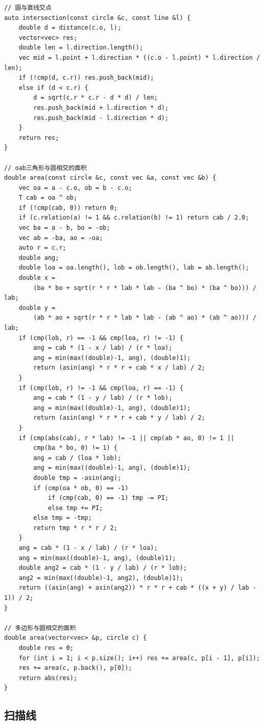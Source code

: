 \documentclass[UTF8]{ctexart}
\begin{document}
\begin{sloppypar}
\begin{lstlisting}[style=cpp]
// 圆与直线交点
auto intersection(const circle &c, const line &l) {
    double d = distance(c.o, l);
    vector<vec> res;
    double len = l.direction.length();
    vec mid = l.point + l.direction * ((c.o - l.point) * l.direction / len);
    if (!cmp(d, c.r)) res.push_back(mid);
    else if (d < c.r) {
        d = sqrt(c.r * c.r - d * d) / len;
        res.push_back(mid + l.direction * d);
        res.push_back(mid - l.direction * d);
    }
    return res;
}

// oab三角形与圆相交的面积
double area(const circle &c, const vec &a, const vec &b) {
    vec oa = a - c.o, ob = b - c.o;
    T cab = oa ^ ob;
    if (!cmp(cab, 0)) return 0;
    if (c.relation(a) != 1 && c.relation(b) != 1) return cab / 2.0;
    vec ba = a - b, bo = -ob;
    vec ab = -ba, ao = -oa;
    auto r = c.r;
    double ang;
    double loa = oa.length(), lob = ob.length(), lab = ab.length();
    double x =
        (ba * bo + sqrt(r * r * lab * lab - (ba ^ bo) * (ba ^ bo))) / lab;
    double y =
        (ab * ao + sqrt(r * r * lab * lab - (ab ^ ao) * (ab ^ ao))) / lab;
    if (cmp(lob, r) == -1 && cmp(loa, r) != -1) {
        ang = cab * (1 - x / lab) / (r * loa);
        ang = min(max((double)-1, ang), (double)1);
        return (asin(ang) * r * r + cab * x / lab) / 2;
    }
    if (cmp(lob, r) != -1 && cmp(loa, r) == -1) {
        ang = cab * (1 - y / lab) / (r * lob);
        ang = min(max((double)-1, ang), (double)1);
        return (asin(ang) * r * r + cab * y / lab) / 2;
    }
    if (cmp(abs(cab), r * lab) != -1 || cmp(ab * ao, 0) != 1 ||
        cmp(ba * bo, 0) != 1) {
        ang = cab / (loa * lob);
        ang = min(max((double)-1, ang), (double)1);
        double tmp = -asin(ang);
        if (cmp(oa * ob, 0) == -1)
            if (cmp(cab, 0) == -1) tmp -= PI;
            else tmp += PI;
        else tmp = -tmp;
        return tmp * r * r / 2;
    }
    ang = cab * (1 - x / lab) / (r * loa);
    ang = min(max((double)-1, ang), (double)1);
    double ang2 = cab * (1 - y / lab) / (r * lob);
    ang2 = min(max((double)-1, ang2), (double)1);
    return ((asin(ang) + asin(ang2)) * r * r + cab * ((x + y) / lab - 1)) / 2;
}

// 多边形与圆相交的面积
double area(vector<vec> &p, circle c) {
    double res = 0;
    for (int i = 1; i < p.size(); i++) res += area(c, p[i - 1], p[i]);
    res += area(c, p.back(), p[0]);
    return abs(res);
}
\end{lstlisting}

\subsection{扫描线}


\end{sloppypar}
\end{document}
